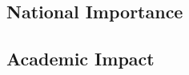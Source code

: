 \subsection*{National Importance}
\label{sec:national_importance}

\subsection*{Academic Impact}
\label{sec:academic_impact}



\let\oldbibliography\thebibliography
\renewcommand{\thebibliography}[1]{\oldbibliography{#1}
\setlength{\itemsep}{-3pt}}


{
\scriptsize

}

